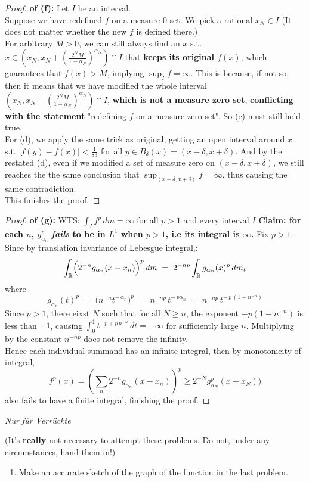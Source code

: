 \documentclass[lang=cn,11pt]{elegantbook}
\begin{document}
\begin{proof}
\textbf{of (f):} 
Let $I$ be an interval.\\
Suppose we have redefined $f$ on a measure $0$ set. We pick a rational $x_N \in I$ (It does not matter whether the new $f$ is defined there.)\\
For arbitrary $M>0$, we can still always find an $x$ s.t. $x \in (x_N, x_N + (\frac{2^N M}{1-\alpha_N})^{\alpha_N}) \cap I$ that \textbf{keeps its original $f(x)$}, which guarantees that $f(x) > M$, implying $\sup_I f = \infty$. This is because, if not so, then it means that we have modified the whole interval $(x_N, x_N + (\frac{2^N M}{1-\alpha_N})^{\alpha_N}) \cap I$, \textbf{which is not a measure zero set}, \textbf{conflicting with the statement} "redefining $f$ on a measure zero set".
So (e) must still hold true.\\
For (d), we apply the same trick as original, getting an open interval around $x$ s.t. $|f(y) - f(x)| < \frac{1}{83}$ for all $y \in B_\delta (x) = (x-\delta, x+ \delta)$. And by the restated (d), even if we modified a set of measure zero on $(x-\delta, x+ \delta)$, we still reaches the the same conclusion that $\sup_{(x-\delta, x+ \delta)} f = \infty$, thus causing the same contradiction.\\
This finishes the proof.
\end{proof}



\begin{proof}
\textbf{of (g):}
WTS: \(\int_I f^p \, d m = \infty\) for all \(p>1\) and every interval \(I\)
\textbf{Claim: for each $n$,  \(g_{\alpha_n}^p\) \emph{fails} to be in \(L^1\) when \(p>1\), i.e its integral is $\infty$.}
Fix $p>1$.\\
Since by translation invariance of Lebesgue integral,:
\[
  \int_{\mathbb{R}} \Bigl(2^{-n}g_{\alpha_n}(x - x_n)\Bigr)^p \, d m
  \;=\;
  2^{-np}\int_{\mathbb{R}} g_{\alpha_n}(x)^p \, d m_t 
\]
where
\[
  g_{\alpha_n}(t)^p 
  \;=\;
  \bigl(n^{-n}t^{-\,\alpha_n}\bigr)^p
  \;=\;
  n^{-np}\,t^{-\,p\alpha_n}
  \;=\;
  n^{-np}\,t^{-\,p\,(1 - n^{-n})}
\]
Since \(p > 1\), there eixst $N$ such that for all $N\geq n$, the exponent \(-p(1-n^{-n})\) is less than \(-1\), causing \(\int_0^1 t^{-p + p\,n^{-n}}\,dt = +\infty\) for sufficiently large \(n\).  Multiplying by the constant \(n^{-np}\) does not remove the infinity. \\
Hence each individual summand has an infinite integral, then by monotonicity of integral, \[
f^p(x) = (\sum_n 2^{-n}g_{\alpha_n}(x - x_n))^p \geq 2^{-N}g^p_{\alpha_N}(x - x_N))
\]also fails to have a finite integral, finishing the proof.
\end{proof}








\begin{center}
  \textit{Nur f\"ur Verr\"uckte}
\end{center}
(It's \textbf{really} not necessary to attempt these problems. Do not, under any circumstances, hand them in!) 

\begin{enumerate}
    \item Make an accurate sketch of the graph of the function in the last problem.
\end{enumerate}
\end{document}
